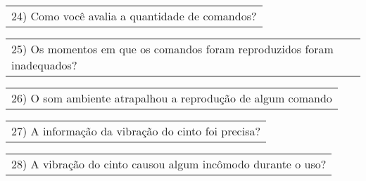 \begin{table}[!thb]
    \begin{tabular}{m{1\linewidth}}
        \vspace{1ex}
        24)	Como você avalia a quantidade de comandos?
    \end{tabular}

    
    

    \begin{tabular}{m{1\linewidth}}
        \vspace{1ex}
        25)	Os momentos em que os comandos foram reproduzidos foram inadequados?
    \end{tabular}

    
    

    \begin{tabular}{m{1\linewidth}}
        \vspace{1ex}
        26)	O som ambiente atrapalhou a reprodução de algum comando
    \end{tabular}

    
    

    \begin{tabular}{m{1\linewidth}}
        \vspace{1ex}
        27)	A informação da vibração do cinto foi precisa?
    \end{tabular}

    
    

    \begin{tabular}{m{1\linewidth}}
        \vspace{1ex}
        28)	A vibração do cinto causou algum incômodo durante o uso?
    \end{tabular}

    
    

\end{table}

\FloatBarrier

